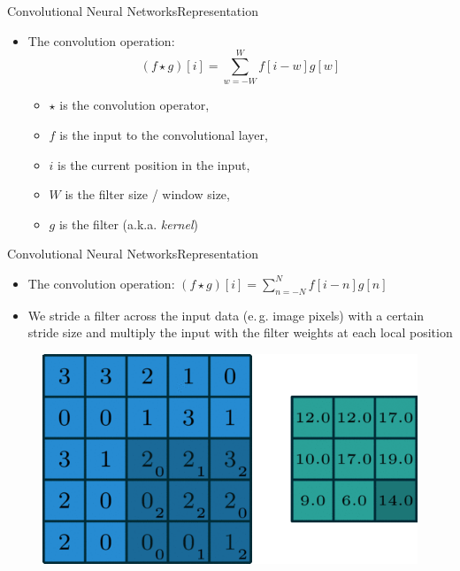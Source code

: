 \begin{frame}{Convolutional Neural Networks}{Representation}
	\begin{itemize}
		\item The convolution operation: $$(f \star g)[i] = \sum_{w=-W}^W f[i-w] g[w]$$\vspace{-0.3cm}
		\begin{itemize}
			\item $\star$ is the convolution operator,
			\item $f$ is the input to the convolutional layer,
			\item $i$ is the current position in the input,
			\item $W$ is the filter size / window size,
			\item $g$ is the filter (a.k.a. \textit{kernel})
		\end{itemize}
	\end{itemize}
\end{frame}

\begin{frame}{Convolutional Neural Networks}{Representation}
	\begin{itemize}
		\item The convolution operation: $(f \star g)[i] = \sum_{n=-N}^N f[i-n] g[n]$
		\item We stride a filter across the input data (e.\,g. image pixels) with a certain stride size and multiply the input with the filter weights at each local position
	\end{itemize}
	\begin{figure}
		\centering
		\includegraphics[scale=0.90]{10_deep_learning/02_img/flatconvolution}
	\end{figure}
\end{frame}

